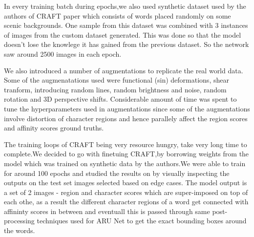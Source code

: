 In every training batch during epochs,we also used synthetic dataset used by the authors of CRAFT paper which consists of words placed randomly on some scenic backgrounds. One sample from this dataset was combined with 3 instances of images from the custom dataset generated. This was done so that the model doesn't lose the knowlege it has gained from the previous dataset. So the network saw around 2500 images in each epoch.

We also introduced a number of augmentations to replicate the real world data. Some of the augmenatations used were functional (sin) deformations, shear tranform, introducing random lines, random brightness and noise, random rotation and 3D perspective shifts. Considerable amount of time was spent to tune the hyperparameters used in augmentations since some of the augmentations involve distortion of character regions and hence parallely affect the region scores and affinity scores ground truths.

The training loops of CRAFT being very resource hungry, take very long time to complete.We decided to go with finetuing CRAFT,by borrowing weights from the model which was trained on synthetic data by the authors.We were able to train for around 100 epochs and studied the results on by visually inspecting the outputs on the test set images selected based on edge cases. 
The model output is a set of 2 images - region and character scores which are super-imposed on top of each othe, as a result the different character regions of a word get connected with affininty scores in between and eventuall this is passed through same post-processing techniques used for ARU Net to get the exact bounding boxes around the words.




